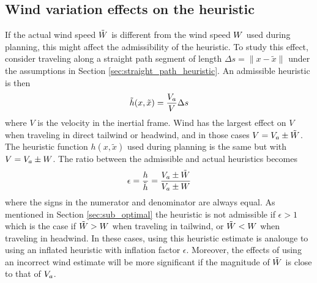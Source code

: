 \subsection{Wind variation effects on the heuristic}
If the actual wind speed $\tilde{W}$ is different from the wind speed $W$ used during planning, this 
might affect the admissibility of the heuristic. 
To study this effect, consider traveling along a straight path segment of length $\Delta s=\|x-\tilde{x}\|$ under the assumptions in Section \ref{sec:straight_path_heuristic}. 
An admissible heuristic is then 
\begin{equation}
    \tilde{h}(x, \tilde{x})=\frac{V_a}{V}\Delta s
\end{equation}
where $V$ is the velocity in the inertial frame. Wind has the largest effect on $V$ when traveling in direct tailwind or headwind, and in those cases $V=V_a\pm \tilde{W}$. The 
heuristic function $h(x, \tilde{x})$ used during planning is the same but with $V=V_a\pm W$. The ratio between the admissible and actual heuristics becomes
\begin{equation}\label{eq:wind_heuristic_eps}
    \epsilon = \frac{h}{\tilde{h}} = \frac{V_a \pm \tilde{W}}{V_a \pm W}
\end{equation}
where the signs in the numerator and denominator are always equal. As mentioned in Section \ref{sec:sub_optimal} the heuristic is not admissible if 
$\epsilon>1$ which is the case if $\tilde{W}>W$ when traveling in tailwind, or $\tilde{W}<W$ when traveling in headwind.
In these cases, using this heuristic estimate is analouge to using an inflated heuristic with inflation factor $\epsilon$. Moreover, the effects of using an incorrect wind estimate will be more significant if the 
magnitude of $\tilde{W}$ is close to that of $V_a$.